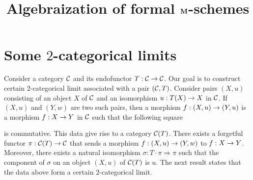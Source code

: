 \title{Algebraization of formal $\mathbf{M}$-schemes}
\date{}
\maketitle

\section{Some $2$-categorical limits}
\noindent
Consider a category ${\mathcal C}$ and its endofunctor $T:{\mathcal C}\rightarrow {\mathcal C}$. Our goal is to construct certain $2$-categorical limit associated with a pair $({\mathcal C},T)$. Consider pairs $\left(X,u\right)$ consisting of an object $X$ of ${\mathcal C}$ and an isomorphism $u:T(X)\rightarrow X$ in ${\mathcal C}$. If $\left(X,u\right)$ and $\left(Y,w\right)$ are two such pairs, then a morphism $f:(X,u) \rightarrow (Y,u)$ is a morphism $f:X\rightarrow Y$ in ${\mathcal C}$ such that the following square
\begin{center}
\end{center}
is commutative. This data give rise to a category ${\mathcal C}(T)$. There exists a forgetful functor $\pi:{\mathcal C}(T)\rightarrow {\mathcal C}$ that sends a morphism $f:(X,u)\rightarrow (Y,w)$ to $f:X\rightarrow Y$. Moreover, there exists a natural isomorphism $\sigma:T\cdot \pi \Rightarrow \pi$ such that the component of $\sigma$ on an object $(X,u)$ of ${\mathcal C}(T)$ is $u$. The next result states that the data above form a certain $2$-categorical limit.

